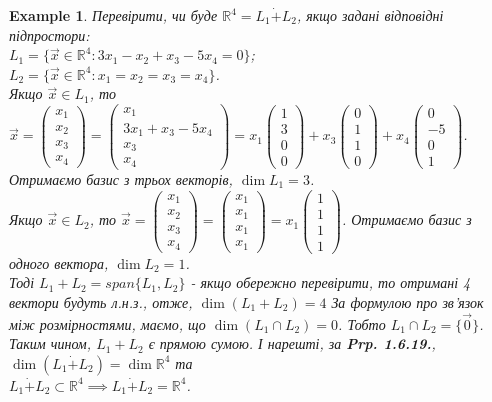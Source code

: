 \documentclass[a4paper, 10pt]{article}
\theoremstyle{theoremdd}
\theoremstyle{theoremdd}
\theoremstyle{theoremdd}
\theoremstyle{theoremdd}
\newtheorem{example}[theorem]{Example}
\theoremstyle{theoremdd}
\theoremstyle{theoremdd}
\theoremstyle{theoremdd}
\theoremstyle{theoremdd}
\begin{document}
	\begin{example}
	Перевірити, чи буде $\mathbb{R}^4 = L_1 \dot{+} L_2$, якщо задані відповідні підпростори:\\
	$L_1 = \{\vec{x} \in \mathbb{R}^4: 3x_1 - x_2 + x_3 - 5x_4 = 0\}$;\\
	$L_2 = \{\vec{x} \in \mathbb{R}^4: x_1 = x_2 = x_3 = x_4\}$.\\
	Якщо $\vec{x} \in L_1$, то $\vec{x} = \begin{pmatrix} x_1 \\ x_2 \\ x_3 \\ x_4 \end{pmatrix} = \begin{pmatrix}
	x_1 \\ 3x_1+x_3-5x_4 \\ x_3 \\ x_4
	\end{pmatrix} = x_1 \begin{pmatrix}
	1 \\ 3 \\ 0 \\ 0
	\end{pmatrix} + x_3\begin{pmatrix}
	0 \\ 1 \\ 1 \\ 0
	\end{pmatrix} +  x_4\begin{pmatrix}
	0 \\ -5 \\ 0 \\ 1
	\end{pmatrix}$. Отримаємо базис з трьох векторів, $\dim L_1 = 3$.\\
	Якщо $\vec{x} \in L_2$, то $\vec{x} = \begin{pmatrix} x_1 \\ x_2 \\ x_3 \\ x_4 \end{pmatrix} = \begin{pmatrix} x_1 \\ x_1 \\ x_1 \\ x_1 \end{pmatrix} = x_1 \begin{pmatrix} 1 \\ 1 \\ 1 \\ 1 \end{pmatrix}$. Отримаємо базис з одного вектора, $\dim L_2 = 1$.\\
	Тоді $L_1 + L_2 = span\{L_1,L_2\}$ - якщо обережно перевірити, то отримані 4 вектори будуть л.н.з., отже, $\dim (L_1 + L_2) = 4$ За формулою про зв'язок між розмірностями, маємо, що $\dim{(L_1 \cap L_2)} = 0$. Тобто $L_1 \cap L_2 = \{ \vec{0} \}$.\\
	Таким чином, $L_1 + L_2$ є прямою сумою. І нарешті, за \textbf{Prp. 1.6.19.}, $\dim{(L_1 \dot{+} L_2)} = \dim {\mathbb{R}^4}$ та \\ $L_1 \dot{+} L_2 \subset \mathbb{R}^4 \implies L_1 \dot{+} L_2 = \mathbb{R}^4$.
	\end{example}
	\newpage	
	
\end{document}
